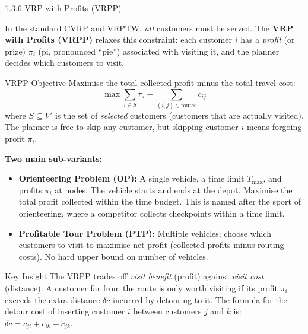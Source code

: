 \documentclass[aspectratio=169,10pt]{beamer}
\begin{document}
\begin{frame}[allowframebreaks]{1.3.6 VRP with Profits (VRPP)}

In the standard CVRP and VRPTW, \emph{all} customers must be served.  The
\textbf{VRP with Profits (VRPP)} relaxes this constraint: each customer $i$ has a
\emph{profit} (or prize) $\pi_i$ (pi, pronounced ``pie'') associated with visiting it,
and the planner decides which customers to visit.

\begin{block}{VRPP Objective}
Maximise the total collected profit minus the total travel cost:
\[
  \max \sum_{i \in S} \pi_i - \sum_{(i,j) \in \text{routes}} c_{ij}
\]
where $S \subseteq V'$ is the set of \emph{selected} customers (customers that are
actually visited).  The planner is free to skip any customer, but skipping customer
$i$ means forgoing profit $\pi_i$.
\end{block}

\textbf{Two main sub-variants:}

\begin{itemize}
  \item \textbf{Orienteering Problem (OP):} A single vehicle, a time limit $T_{\max}$,
        and profits $\pi_i$ at nodes.  The vehicle starts and ends at the depot.
        Maximise the total profit collected within the time budget.  This is named after
        the sport of orienteering, where a competitor collects checkpoints within a
        time limit.

  \item \textbf{Profitable Tour Problem (PTP):} Multiple vehicles; choose which
        customers to visit to maximise net profit (collected profits minus routing costs).
        No hard upper bound on number of vehicles.
\end{itemize}

\begin{alertblock}{Key Insight}
The VRPP trades off \emph{visit benefit} (profit) against \emph{visit cost} (distance).
A customer far from the route is only worth visiting if its profit $\pi_i$ exceeds the
extra distance $\delta c$ incurred by detouring to it.  The formula for the detour cost
of inserting customer $i$ between customers $j$ and $k$ is:
$\delta c = c_{ji} + c_{ik} - c_{jk}$.
\end{alertblock}

\end{frame}
\end{document}
